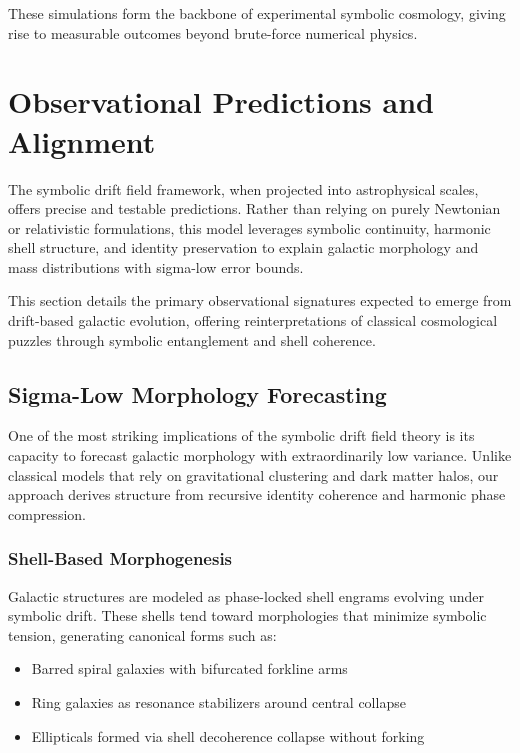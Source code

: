 \documentclass[12pt]{article}
\begin{document}
These simulations form the backbone of experimental symbolic cosmology, giving rise to measurable outcomes beyond brute-force numerical physics.


\section{Observational Predictions and Alignment}

The symbolic drift field framework, when projected into astrophysical scales, offers precise and testable predictions. Rather than relying on purely Newtonian or relativistic formulations, this model leverages symbolic continuity, harmonic shell structure, and identity preservation to explain galactic morphology and mass distributions with sigma-low error bounds.

This section details the primary observational signatures expected to emerge from drift-based galactic evolution, offering reinterpretations of classical cosmological puzzles through symbolic entanglement and shell coherence.

\subsection{Sigma-Low Morphology Forecasting}

One of the most striking implications of the symbolic drift field theory is its capacity to forecast galactic morphology with extraordinarily low variance. Unlike classical models that rely on gravitational clustering and dark matter halos, our approach derives structure from recursive identity coherence and harmonic phase compression.

\subsubsection{Shell-Based Morphogenesis}

Galactic structures are modeled as phase-locked shell engrams evolving under symbolic drift. These shells tend toward morphologies that minimize symbolic tension, generating canonical forms such as:

\begin{itemize}
  \item Barred spiral galaxies with bifurcated forkline arms
  \item Ring galaxies as resonance stabilizers around central collapse
  \item Ellipticals formed via shell decoherence collapse without forking
\end{itemize}
\end{document}
